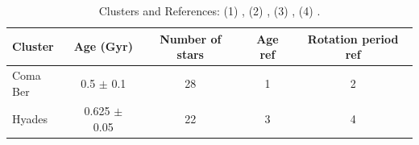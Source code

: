 \documentclass[useAMS, usenatbib]{mn2e}
\newcommand{\prot}{$P_{rot}~$}
\begin{document}
\begin{table}
\caption{Clusters and References: (1) \citet{Dobbie2009},
	(2) \citet{CollierCameron2009}, (3) \citet{Perryman1998},
	(4) \citet{Radick1987}. \label{tab:clust}}
\begin{tabular}{lcccc}
\hline\hline
Cluster & Age (Gyr) & Number of stars & Age ref & Rotation period ref \\
\hline
Coma Ber & 0.5 $\pm$ 0.1 & 28 & 1 & 2 \\
Hyades & 0.625 $\pm$ 0.05 & 22 & 3 & 4 \\
\hline
\end{tabular}
\end{table}

%
\end{document}
